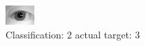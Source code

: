 \begin{figure}[h!]
\begin{center}
\includegraphics[width=0.60\columnwidth]{figures/ID1152_class_2_target_3.png}
\end{center}
\caption{ Classification: 2 actual target: 3}
\label{fig:ID1152_class_2_target_3}
\end{figure}
